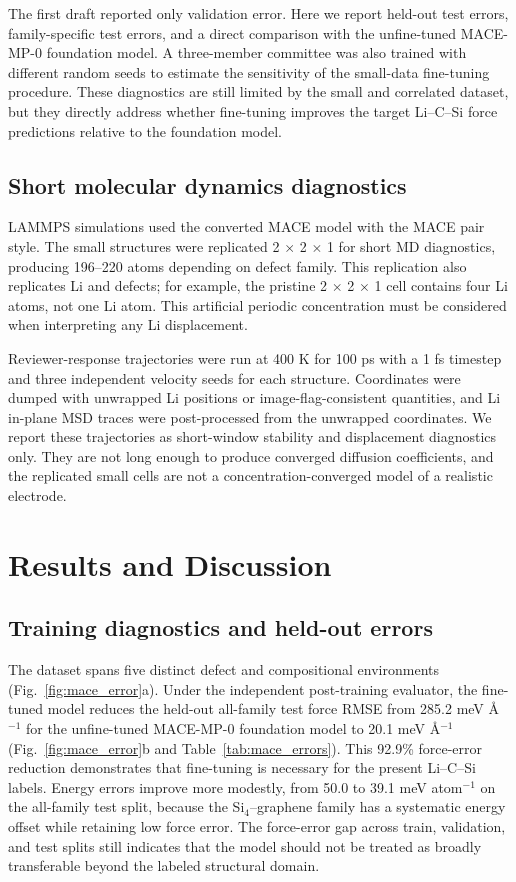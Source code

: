 \documentclass[12pt]{article}
\begin{document}
The first draft reported only validation error. Here we report held-out test errors, family-specific test errors, and a direct comparison with the unfine-tuned MACE-MP-0 foundation model. A three-member committee was also trained with different random seeds to estimate the sensitivity of the small-data fine-tuning procedure. These diagnostics are still limited by the small and correlated dataset, but they directly address whether fine-tuning improves the target Li--C--Si force predictions relative to the foundation model.

\subsection{Short molecular dynamics diagnostics}

LAMMPS \citep{plimpton1995lammps} simulations used the converted MACE model with the MACE pair style. The small structures were replicated 2 $\times$ 2 $\times$ 1 for short MD diagnostics, producing 196--220 atoms depending on defect family. This replication also replicates Li and defects; for example, the pristine 2 $\times$ 2 $\times$ 1 cell contains four Li atoms, not one Li atom. This artificial periodic concentration must be considered when interpreting any Li displacement.

Reviewer-response trajectories were run at 400 K for 100 ps with a 1 fs timestep and three independent velocity seeds for each structure. Coordinates were dumped with unwrapped Li positions or image-flag-consistent quantities, and Li in-plane MSD traces were post-processed from the unwrapped coordinates. We report these trajectories as short-window stability and displacement diagnostics only. They are not long enough to produce converged diffusion coefficients, and the replicated small cells are not a concentration-converged model of a realistic electrode.

\section{Results and Discussion}

\subsection{Training diagnostics and held-out errors}

The dataset spans five distinct defect and compositional environments (Fig.~\ref{fig:mace_error}a). Under the independent post-training evaluator, the fine-tuned model reduces the held-out all-family test force RMSE from 285.2 meV \AA$^{-1}$ for the unfine-tuned MACE-MP-0 foundation model to 20.1 meV \AA$^{-1}$ (Fig.~\ref{fig:mace_error}b and Table~\ref{tab:mace_errors}). This 92.9\% force-error reduction demonstrates that fine-tuning is necessary for the present Li--C--Si labels. Energy errors improve more modestly, from 50.0 to 39.1 meV atom$^{-1}$ on the all-family test split, because the Si$_4$--graphene family has a systematic energy offset while retaining low force error. The force-error gap across train, validation, and test splits still indicates that the model should not be treated as broadly transferable beyond the labeled structural domain.
\end{document}
